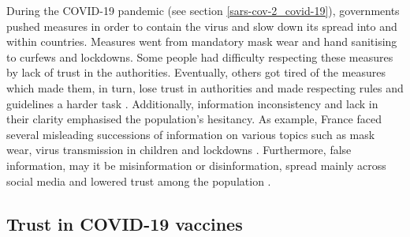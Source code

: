 During the COVID-19 pandemic (see section \ref{sars-cov-2_covid-19}), governments pushed measures in order to contain the virus and slow down its spread into and within countries. Measures went from mandatory mask wear and hand sanitising to curfews and lockdowns. Some people had difficulty respecting these measures by lack of trust in the authorities. Eventually, others got tired of the measures which made them, in turn, lose trust in authorities and made respecting rules and guidelines a harder task \cite{strandberg2020coronavirus, goldstein2021lockdown}.
Additionally, information inconsistency and lack in their clarity emphasised the population's hesitancy. As example, France faced several misleading successions of information on various topics such as mask wear, virus transmission in children and lockdowns
\cite{gautreau_informations_contradictoires_2020, mazoue_masque_inutile_a_obligatoire_2020}.
Furthermore, false information, may it be misinformation or disinformation, spread mainly across social media and lowered trust among the population \cite{oecd_transparency_disinformation_2020, enria_trust_survey_2021, erku_misinformation_2021, abd-alrazaq_top_2020}.

\subsection{Trust in COVID-19 vaccines}


